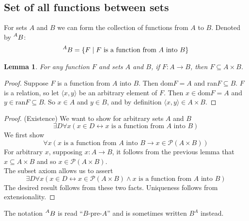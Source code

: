 \documentclass{report}
\newtheorem{lemma}[theo]{Lemma}
\begin{document}
\subsection{Set of all functions between sets}
For sets $A$ and $B$ we can form the collection of functions from $A$ to $B$. Denoted by $\prescript{A}{}{B}$:
\begin{equation*}
\prescript{A}{}{B}=\{F\mid F\text{ is a function from $A$ into $B$}\}
\end{equation*}
\begin{lemma}
For any function $F$ and sets $A$ and $B$, if $F:A\to B$, then $F\subseteq A\times B$.
\end{lemma}
\begin{proof}
Suppose $F$ is a function from $A$ into $B$. Then $\text{dom}F=A$ and ran$F\subseteq B$.
$F$ is a relation, so let $\langle x,y\rangle$ be an arbitrary element of $F$. Then $x\in\text{dom}F=A$ and $y\in\text{ran}F\subseteq B$. So $x\in A$ and $y\in B$, and by definition
$\langle x,y\rangle\in A\times B$.
\end{proof}
\begin{proof}(Existence)
We want to show for arbitrary sets $A$ and $B$
\begin{equation*}
\exists D\forall x(x\in D\leftrightarrow x\text{ is a function from $A$ into $B$})
\end{equation*}
We first show
\begin{equation*}
\forall x(x\text{ is a function from $A$ into $B$}\to x\in\mathscr P(A\times B))
\end{equation*}
For arbitrary $x$, supposing $x:A\to B$, it follows from the previous lemma that $x\subseteq A\times B$ and so $x\in\mathscr P(A\times B)$.\\
\indent The subset axiom allows us to assert
\begin{equation*}
\exists D\forall x(x\in D\leftrightarrow x\in\mathscr P(A\times B)\land x\text{ is a function from $A$ into $B$})
\end{equation*}
The desired result follows from these two facts. Uniqueness follows from extensionality.
\end{proof}
\noindent The notation $\prescript{A}{}{B}$ is read ``$B$-pre-$A$'' and is sometimes written $B^A$ instead. 
\newpage
\end{document}
